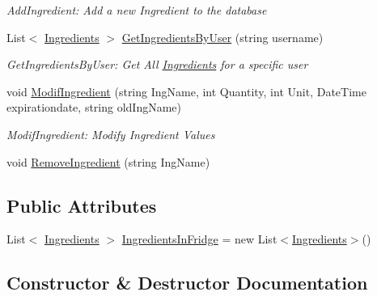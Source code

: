 \begin{DoxyCompactItemize}
\begin{DoxyCompactList}\small\item\em Add\+Ingredient\+: Add a new Ingredient to the database \end{DoxyCompactList}\item 
List$<$ \hyperlink{class_projet_free_go_windows_1_1_ingredients}{Ingredients} $>$ \hyperlink{class_projet_free_go_windows_1_1connection_d_b_a18ad4bdf2a991803a1a2b4d8e39c5900}{Get\+Ingredients\+By\+User} (string username)
\begin{DoxyCompactList}\small\item\em Get\+Ingredients\+By\+User\+: Get All \hyperlink{class_projet_free_go_windows_1_1_ingredients}{Ingredients} for a specific user \end{DoxyCompactList}\item 
void \hyperlink{class_projet_free_go_windows_1_1connection_d_b_ae604e65630f4bd5efa4bfc3782b9e596}{Modif\+Ingredient} (string Ing\+Name, int Quantity, int Unit, Date\+Time expirationdate, string old\+Ing\+Name)
\begin{DoxyCompactList}\small\item\em Modif\+Ingredient\+: Modify Ingredient Values \end{DoxyCompactList}\item 
void \hyperlink{class_projet_free_go_windows_1_1connection_d_b_ac4c80e807d95242a5c57c94616b32d21}{Remove\+Ingredient} (string Ing\+Name)
\end{DoxyCompactItemize}
\subsection*{Public Attributes}
\begin{DoxyCompactItemize}
\item 
List$<$ \hyperlink{class_projet_free_go_windows_1_1_ingredients}{Ingredients} $>$ \hyperlink{class_projet_free_go_windows_1_1connection_d_b_a012e8aab7de16e823696c80b8cbfb942}{Ingredients\+In\+Fridge} = new List$<$\hyperlink{class_projet_free_go_windows_1_1_ingredients}{Ingredients}$>$()
\end{DoxyCompactItemize}


\subsection{Constructor \& Destructor Documentation}
\mbox{\label{class_projet_free_go_windows_1_1connection_d_b_a74e5cd91e5b8a2d76686a461825928b3}} 

